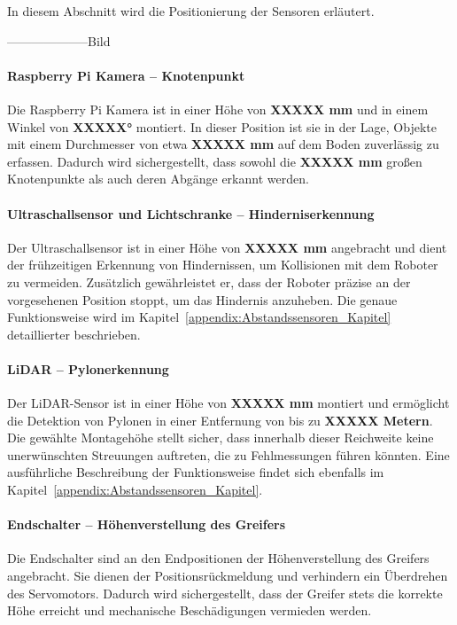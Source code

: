 \documentclass[main.tex]{subfiles} %
\begin{document}
In diesem Abschnitt wird die Positionierung der Sensoren erläutert.

--------------------Bild

\paragraph{Raspberry Pi Kamera – Knotenpunkt}

Die Raspberry Pi Kamera ist in einer Höhe von \textbf{XXXXX mm} und in einem Winkel von \textbf{XXXXX°} montiert. 
In dieser Position ist sie in der Lage, Objekte mit einem Durchmesser von etwa \textbf{XXXXX mm} auf 
dem Boden zuverlässig zu erfassen. Dadurch wird sichergestellt, dass sowohl die \textbf{XXXXX mm} großen 
Knotenpunkte als auch deren Abgänge erkannt werden.

\paragraph{Ultraschallsensor und Lichtschranke – Hinderniserkennung}

Der Ultraschallsensor ist in einer Höhe von \textbf{XXXXX mm} angebracht und dient der frühzeitigen 
Erkennung von Hindernissen, um Kollisionen mit dem Roboter zu vermeiden. Zusätzlich gewährleistet er, 
dass der Roboter präzise an der vorgesehenen Position stoppt, um das Hindernis anzuheben. Die genaue 
Funktionsweise wird im Kapitel~\ref{appendix:Abstandssensoren_Kapitel} detaillierter beschrieben.

\paragraph{LiDAR – Pylonerkennung}

Der LiDAR-Sensor ist in einer Höhe von \textbf{XXXXX mm} montiert und ermöglicht die Detektion von 
Pylonen in einer Entfernung von bis zu \textbf{XXXXX Metern}. Die gewählte Montagehöhe stellt sicher, 
dass innerhalb dieser Reichweite keine unerwünschten Streuungen auftreten, die zu Fehlmessungen führen 
könnten. Eine ausführliche Beschreibung der Funktionsweise findet sich ebenfalls im 
Kapitel~\ref{appendix:Abstandssensoren_Kapitel}.

\paragraph{Endschalter – Höhenverstellung des Greifers}

Die Endschalter sind an den Endpositionen der Höhenverstellung des Greifers angebracht. 
Sie dienen der Positionsrückmeldung und verhindern ein Überdrehen des Servomotors. Dadurch wird 
sichergestellt, dass der Greifer stets die korrekte Höhe erreicht und mechanische Beschädigungen vermieden werden.
\end{document}
